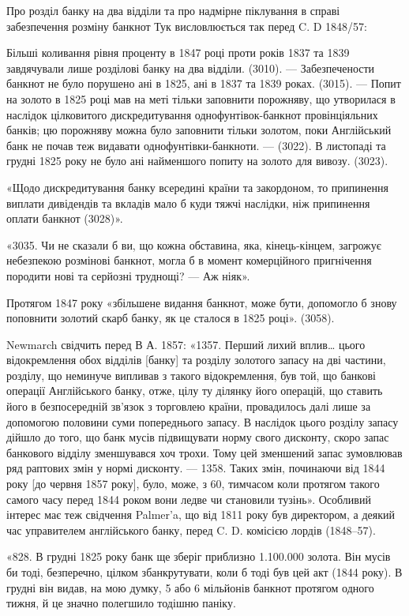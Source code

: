 
Про розділ банку на два відділи та про надмірне піклування в справі забезпечення
розміну банкнот Тук висловлюється так перед C. D 1848/57:

Більші коливання рівня проценту в 1847 році проти років 1837 та 1839
завдячували лише розділові банку на два відділи. (3010). — Забезпечености банкнот
не було порушено ані в 1825, ані в 1837 та 1839 роках. (3015). — Попит
на золото в 1825 році мав на меті тільки заповнити порожняву, що утворилася
в наслідок цілковитого дискредитування однофунтівок-банкнот провінціяльних
банків; цю порожняву можна було заповнити тільки золотом, поки Англійський
банк не почав теж видавати однофунтівки-банкноти. — (3022). В листопаді та
грудні 1825 року не було ані найменшого попиту на золото для вивозу. (3023).

«Щодо дискредитування банку всередині країни та закордоном, то припинення
виплати дивідендів та вкладів мало б куди тяжчі наслідки, ніж припинення
оплати банкнот (3028)».

«3035. Чи не сказали б ви, що кожна обставина, яка, кінець-кінцем,
загрожує небезпекою розмінові банкнот, могла б в момент комерційного пригнічення
породити нові та серйозні труднощі? — Аж ніяк».

Протягом 1847 року «збільшене видання банкнот, може бути, допомогло б
знову поповнити золотий скарб банку, як це сталося в 1825 році». (3058).

Newmarch свідчить перед В А. 1857: «1357. Перший лихий вплив\dots{}
цього відокремлення обох відділів [банку] та розділу золотого запасу на дві частини,
розділу, що неминуче випливав з такого відокремлення, був той, що банкові
операції Англійського банку, отже, цілу ту ділянку його операцій, що ставить
його в безпосередній зв’язок з торговлею країни, провадилось далі лише за допомогою
половини суми попереднього запасу. В наслідок цього розділу запасу
дійшло до того, що банк мусів підвищувати норму свого дисконту, скоро запас
банкового відділу зменшувався хоч трохи. Тому цей зменшений запас зумовлював
ряд раптових змін у нормі дисконту. — 1358. Таких змін, починаючи від
1844 року [до червня 1857 року], було, може, з 60, тимчасом коли протягом
такого самого часу перед 1844 роком вони ледве чи становили тузінь». Особливий
інтерес має теж свідчення Palmer’a, що від 1811 року був директором, а
деякий час управителем англійського банку, перед C. D. комісією лордів (1848--57).

«828. В грудні 1825 року банк ще зберіг приблизно \num{1.100.000}
золота. Він мусів би тоді, безперечно, цілком збанкрутувати, коли б тоді був
цей акт (1844 року). В грудні він видав, на мою думку, 5 або 6 мільйонів
банкнот протягом одного тижня, й це значно полегшило тодішню паніку.

